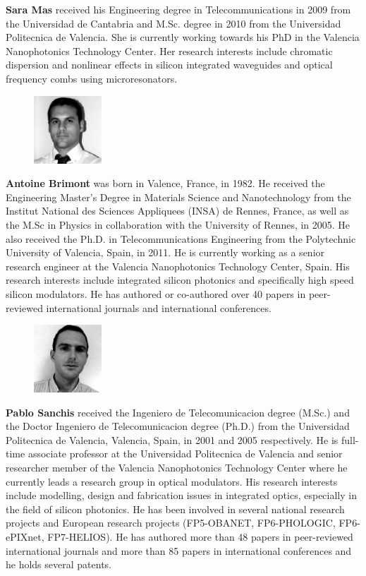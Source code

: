 \documentclass[journal]{IEEEtran}
\newcommand{\extraSpace}{\vspace{30pt}}
\begin{document}
\textbf{Sara Mas} received his Engineering degree in Telecommunications in 2009 from the Universidad de Cantabria and M.Sc. degree in 2010 from the Universidad Politecnica de Valencia. She is currently working towards his PhD in the Valencia Nanophotonics Technology Center. Her research interests include chromatic dispersion and nonlinear effects in silicon integrated waveguides and optical frequency combs using microresonators.
\extraSpace



\begin{figure}
\includegraphics[width=1in]{antoine}
\end{figure}
\textbf{Antoine Brimont} was born in Valence, France, in 1982. He received the Engineering Master's Degree in Materials Science and Nanotechnology from the Institut National des Sciences Appliquees (INSA) de Rennes, France, as well as the M.Sc in Physics in collaboration with the University of Rennes, in 2005. He also received the Ph.D. in Telecommunications Engineering from the Polytechnic University of Valencia, Spain, in 2011. He is currently working as a senior research engineer at the Valencia Nanophotonics Technology Center, Spain. His research interests include integrated silicon photonics and specifically high speed silicon modulators. He has authored or co-authored over 40 papers in peer-reviewed international journals and international conferences.
\extraSpace

\begin{figure}
\includegraphics[width=1in]{pablo}
\end{figure}

\textbf{Pablo Sanchis} received the Ingeniero de Telecomunicacion degree (M.Sc.) and the Doctor Ingeniero de Telecomunicacion degree (Ph.D.) from the Universidad Politecnica de Valencia, Valencia, Spain, in 2001 and 2005 respectively. He is full-time associate professor at the Universidad Politecnica de Valencia and senior researcher member of the Valencia Nanophotonics Technology Center where he currently leads a research group in optical modulators. His research interests include modelling, design and fabrication issues in integrated optics, especially in the field of silicon photonics. He has been involved in several national research projects and European research projects (FP5-OBANET, FP6-PHOLOGIC, FP6-ePIXnet, FP7-HELIOS). He has authored more than 48 papers in peer-reviewed international journals and more than 85 papers in international conferences and he holds several patents.
\extraSpace
\end{document}
